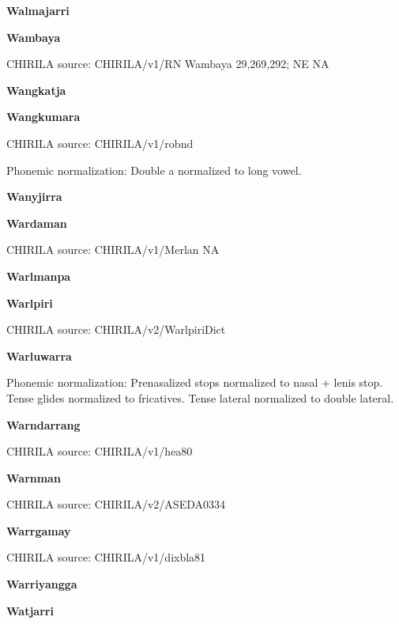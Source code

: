 
\textbf{Walmajarri}


\textbf{Wambaya}

CHIRILA source: CHIRILA/v1/RN Wambaya 29,269,292; NE NA

\textbf{Wangkatja}


\textbf{Wangkumara}

CHIRILA source: CHIRILA/v1/robnd


Phonemic normalization: Double a normalized to long vowel.

\textbf{Wanyjirra}


\textbf{Wardaman}

CHIRILA source: CHIRILA/v1/Merlan NA

\textbf{Warlmanpa}


\textbf{Warlpiri}

CHIRILA source: CHIRILA/v2/WarlpiriDict


\textbf{Warluwarra}


Phonemic normalization: Prenasalized stops normalized to nasal + lenis
stop. Tense glides normalized to fricatives. Tense lateral normalized to
double lateral.

\textbf{Warndarrang}

CHIRILA source: CHIRILA/v1/hea80


\textbf{Warnman}

CHIRILA source: CHIRILA/v2/ASEDA0334


\textbf{Warrgamay}

CHIRILA source: CHIRILA/v1/dixbla81


\textbf{Warriyangga}


\textbf{Watjarri}


